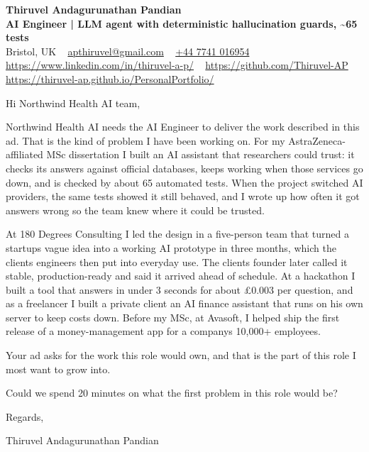 \documentclass[11pt,a4paper]{article}
\begin{document}
\raggedright
\pagestyle{empty}

\begin{center}
    {\LARGE \color{linkblue} \textbf{Thiruvel Andagurunathan Pandian}}\\[0.2cm]
    {\color{headernavy}\small\textbf{AI Engineer | LLM agent with deterministic hallucination guards, \textasciitilde{}65 tests}}\\[0.2cm]
    {\small Bristol, UK\nobreak\ \,\textbar\, \href{mailto:apthiruvel@gmail.com}{apthiruvel@gmail.com}\nobreak\ \,\textbar\, \href{tel:+447741016954}{+44 7741 016954}\nobreak\ \,\textbar\, \href{https://www.linkedin.com/in/thiruvel-a-p/}{https://www.linkedin.com/in/thiruvel-a-p/}\nobreak\ \,\textbar\, \href{https://github.com/Thiruvel-AP}{https://github.com/Thiruvel-AP}\nobreak\ \,\textbar\, \href{https://thiruvel-ap.github.io/PersonalPortfolio/}{https://thiruvel-ap.github.io/PersonalPortfolio/}}

\end{center}

\vspace{0.4cm}

\noindent
Hi Northwind Health AI team,

Northwind Health AI needs the AI Engineer to deliver the work described in this ad. That is the kind of problem I have been working on. For my AstraZeneca-affiliated MSc dissertation I built an AI assistant that researchers could trust: it checks its answers against official databases, keeps working when those services go down, and is checked by about 65 automated tests. When the project switched AI providers, the same tests showed it still behaved, and I wrote up how often it got answers wrong so the team knew where it could be trusted.

At 180 Degrees Consulting I led the design in a five-person team that turned a startup\textquotesingle{}s vague idea into a working AI prototype in three months, which the client\textquotesingle{}s engineers then put into everyday use. The client\textquotesingle{}s founder later called it \textquotedbl{}stable, production-ready\textquotedbl{} and said it arrived \textquotedbl{}ahead of schedule\textquotedbl{}. At a hackathon I built a tool that answers in under 3 seconds for about £0.003 per question, and as a freelancer I built a private client an AI finance assistant that runs on his own server to keep costs down. Before my MSc, at Avasoft, I helped ship the first release of a money-management app for a company\textquotesingle{}s 10,000+ employees.

Your ad asks for the work this role would own, and that is the part of this role I most want to grow into.

Could we spend 20 minutes on what the first problem in this role would be?

\vspace{0.5cm}

Regards,

Thiruvel Andagurunathan Pandian
\end{document}
